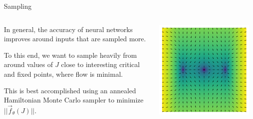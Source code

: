 \documentclass[aspectratio=169, 12pt]{beamer}
\begin{document}
\begin{frame}{Sampling}

    \begin{columns}
        \begin{column}{.6\textwidth}
            
            In general, the accuracy of neural networks improves around inputs that are sampled more. 

            \vspace{1em}

            To this end, we want to sample heavily from around values of $J$ close to interesting critical and fixed points, where flow is minimal. 

            \vspace{1em}

            This is best accomplished using an annealed Hamiltonian Monte Carlo sampler to minimize $|| \vec{f}_\theta(J) ||$. 
            
        \end{column}
        \begin{column}{.4\textwidth}
            \includegraphics[width=\textwidth]{presentation/images/flow-heat.png}
        \end{column}
    \end{columns}
    
\end{frame}
\end{document}
